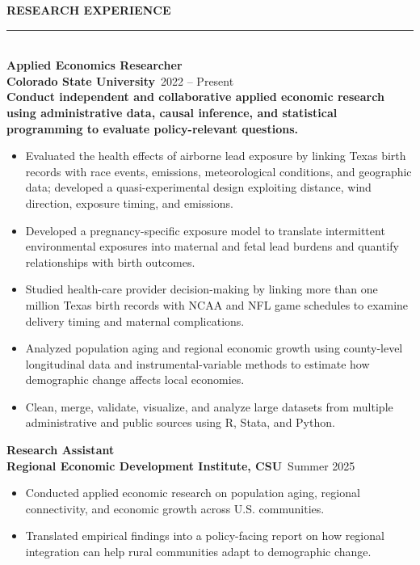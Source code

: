 \documentclass[9pt]{extarticle}
\newcommand{\sectionhead}[1]{%
  \vspace{1pt}
  {\color{rule}\bfseries\large #1}\\[-6pt]
  {\color{rule}\rule{\linewidth}{1.1pt}}\\[3pt]
}
\newcommand{\jobtitle}[1]{\textbf{#1}\\}
\newcommand{\joborg}[2]{{\color{accent}\bfseries #1}\hfill{\small\color{subtext}\smash{\faIcon{calendar-alt}}\ #2}\\[2pt]}
\newcommand{\joborgtight}[2]{{\color{accent}\bfseries #1}\hfill{\small\color{subtext}\smash{\faIcon{calendar-alt}}\ #2}\\[0pt]}
\begin{document}
\noindent
\begin{minipage}[t]{0.63\linewidth}

\sectionhead{RESEARCH EXPERIENCE}

\jobtitle{Applied Economics Researcher}
\joborg{Colorado State University}{2022 -- Present}
{\small\bfseries Conduct independent and collaborative applied
economic research using administrative data, causal inference, and
statistical programming to evaluate policy-relevant questions.}
\begin{itemize}[leftmargin=1.1em,itemsep=0.5pt,topsep=1pt]
  \item Evaluated the health effects of airborne lead exposure by
    linking Texas birth records with race events, emissions,
    meteorological conditions, and geographic data; developed a
    quasi-experimental design exploiting distance, wind direction,
    exposure timing, and emissions.
  \item Developed a pregnancy-specific exposure model to translate
    intermittent environmental exposures into maternal and fetal lead
    burdens and quantify relationships with birth outcomes.
  \item Studied health-care provider decision-making by linking more
    than one million Texas birth records with NCAA and NFL game
    schedules to examine delivery timing and maternal complications.
  \item Analyzed population aging and regional economic growth using
    county-level longitudinal data and instrumental-variable methods
    to estimate how demographic change affects local economies.
  \item Clean, merge, validate, visualize, and analyze large datasets
    from multiple administrative and public sources using R, Stata,
    and Python.
\end{itemize}

\vspace{2pt}
\jobtitle{Research Assistant}
\joborgtight{Regional Economic Development Institute, CSU}{Summer 2025}
\vspace{-9pt}
\begin{itemize}[leftmargin=1.1em,itemsep=0.5pt,topsep=0pt]
  \item Conducted applied economic research on population aging,
    regional connectivity, and economic growth across U.S.
    communities.
  \item Translated empirical findings into a policy-facing report on
    how regional integration can help rural communities adapt to
    demographic change.
\end{itemize}


\end{minipage}
\end{document}
